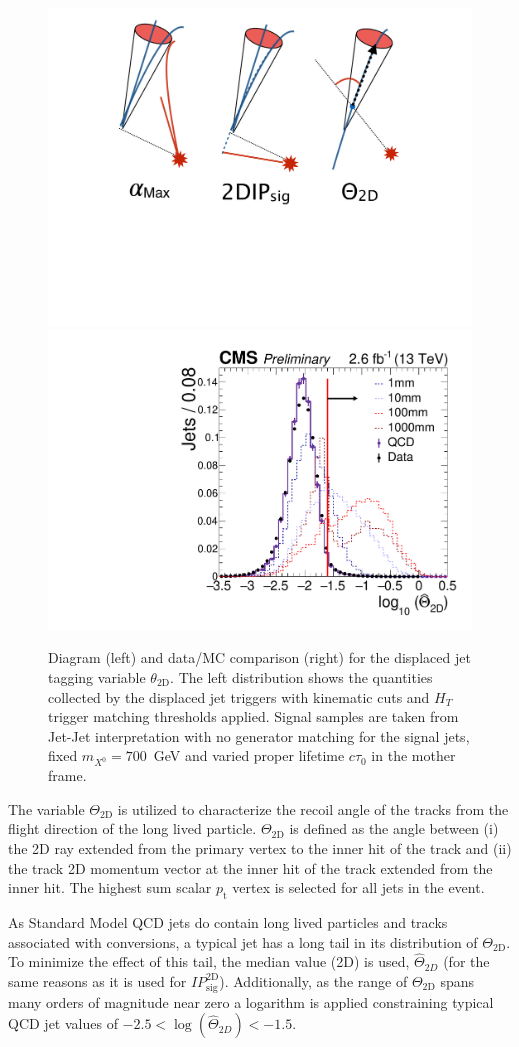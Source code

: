 \begin{figure}
\begin{center}
\includegraphics[width=.2\textwidth]{figures/pas/DIAGRAMS/theta_diag.pdf}
\includegraphics[width=.5\textwidth]{figures/pas/SELECTION/76x_pu/DJET_medianCosTheta.pdf}
\caption{Diagram (left) and data/MC comparison (right) for the displaced jet tagging variable $\theta_{\textrm{2D}}$. The left distribution  shows the quantities collected by the displaced jet triggers with kinematic cuts and $H_T$ trigger matching thresholds applied. Signal samples are taken from Jet-Jet interpretation with no generator matching for the signal jets, fixed $m_{X^0}=700$~GeV and varied proper lifetime $c\tau_0$ in the mother frame.
 \label{fig:theta}}
\end{center}
\end{figure}

The variable $\Theta_{\textrm{2D}}$ is utilized to characterize the recoil angle
of the tracks from the flight direction of the long lived particle. $\Theta_{\textrm{2D}}$ is defined as the angle between (i) the 2D ray extended from the primary vertex
to the inner hit of the track and (ii) the track 2D momentum vector at the inner hit of the track extended from the inner hit. The highest sum scalar $p_{\textrm{t}}$ vertex is selected for all jets in the event.

As Standard Model QCD jets do contain long lived particles and tracks associated with conversions,
a typical jet has a  long tail in its distribution of $\Theta_{\textrm{2D}}$. To minimize the effect of this tail, the median value (2D)
is used, $\widehat{\Theta}_{2D}$ (for the same reasons as it is used for $IP_{\textrm{sig}}^{\textrm{2D}}$). Additionally, as the range
of $\Theta_{\textrm{2D}}$ spans many orders of magnitude near zero a logarithm is applied constraining 
typical QCD jet values of $-2.5 <\log(\widehat{\Theta}_{2D}) < -1.5$. 

